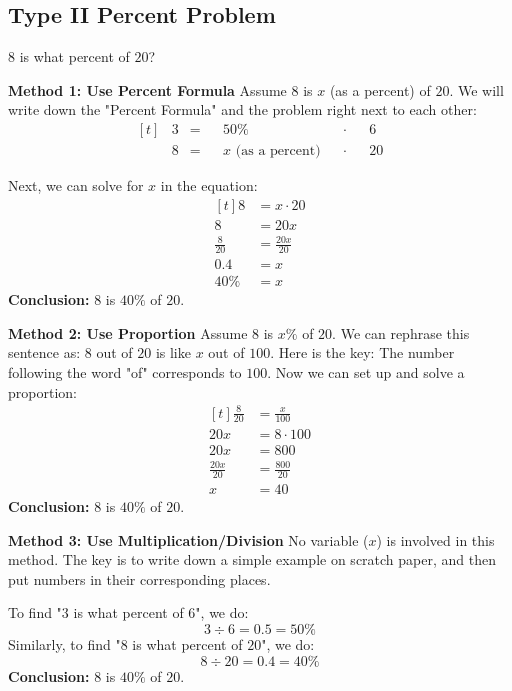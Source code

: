 \subsection{Type II Percent Problem}
\begin{myexample}
$8$ is what percent of $20$?
\end{myexample}
\begin{solution}
\textbf{Method 1: Use Percent Formula} Assume $8$ is $x$ (as a percent) of $20$. We will write down the "Percent Formula" and the problem right next to each other:
\[
\begin{aligned}[t]
	&3 &= &&50\% &&\cdot &&6 \\
	&8 &= &&x \text{ (as a percent)} &&\cdot &&20
\end{aligned}
\]

Next, we can solve for $x$ in the equation:
\[
\begin{aligned}[t]
	8 &= x \cdot 20 \\
	8 &= 20x \\
	\frac{8}{20} &= \frac{20x}{20} \\
	0.4 &= x \\
	40\% &= x
\end{aligned}
\]
\textbf{Conclusion:} $8$ is $40\%$ of $20$.

\textbf{Method 2: Use Proportion}  Assume $8$ is $x\%$ of $20$. We can rephrase this sentence as: $8$ out of $20$ is like $x$ out of $100$. Here is the key: The number following the word "of" corresponds to $100$. Now we can set up and solve a proportion:
\[
\begin{aligned}[t]
	\frac{8}{20} &= \frac{x}{100} \\
	20x &= 8 \cdot 100 \\
	20x &= 800 \\
	\frac{20x}{20} &= \frac{800}{20} \\
	x &= 40
\end{aligned}
\]
\textbf{Conclusion:} $8$ is $40\%$ of $20$.

\textbf{Method 3: Use Multiplication/Division} No variable ($x$) is involved in this method. The key is to write down a simple example on scratch paper, and then put numbers in their corresponding places.

To find "$3$ is what percent of $6$", we do:
\[ 3\div6=0.5=50\% \]
Similarly, to find "$8$ is what percent of $20$", we do:
\[ 8\div20=0.4=40\% \]
\textbf{Conclusion:} $8$ is $40\%$ of $20$.

\end{solution}

